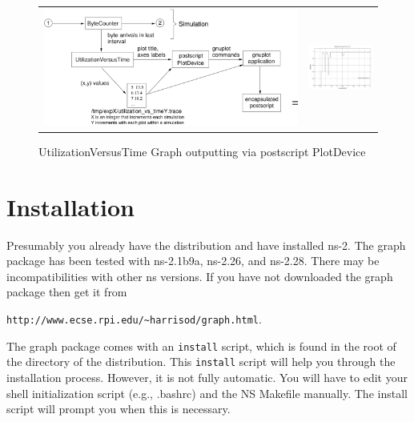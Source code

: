 \documentclass[11pt]{article}
\begin{document}
\begin{figure}
\begin{tabular}{cc}
\includegraphics[width=5in]{plot_device} &
\includegraphics[width=1.25in]{utilization-vs-time}
\end{tabular}
\caption{UtilizationVersusTime Graph outputting via postscript PlotDevice}
\label{PlotDeviceFigure}
\end{figure}

\section{Installation}

Presumably you already have the distribution and have installed
ns-2.   The graph package has been tested with ns-2.1b9a, ns-2.26, 
and ns-2.28.  There may be incompatibilities with 
other ns versions.  If you have not downloaded the graph package then get it
from


\verb|http://www.ecse.rpi.edu/~harrisod/graph.html|.
\vspace{0.1in}

The graph package comes with an \verb|install| script, which is found in the
root of the directory of the distribution.  This \verb|install| script will
help you through the installation process.  However, it is not fully
automatic.  You will have to edit your shell initialization script
(e.g., .bashrc) and the NS Makefile manually.  The install script will
prompt you when this is necessary.
\end{document}
